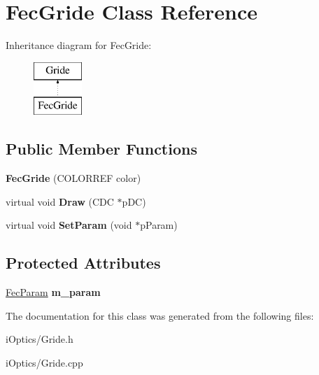 \hypertarget{class_fec_gride}{}\section{Fec\+Gride Class Reference}
\label{class_fec_gride}
Inheritance diagram for Fec\+Gride\+:\begin{figure}[H]
\begin{center}
\leavevmode
\includegraphics[height=2.000000cm]{class_fec_gride}
\end{center}
\end{figure}
\subsection*{Public Member Functions}
\begin{DoxyCompactItemize}
\item 
\mbox{\label{class_fec_gride_ae079599de4464cc0323d2f576a5a3208}} 
{\bfseries Fec\+Gride} (C\+O\+L\+O\+R\+R\+EF color)
\item 
\mbox{\label{class_fec_gride_a8b2a5b5290dfd68fce0ca3ed892e2609}} 
virtual void {\bfseries Draw} (C\+DC $\ast$p\+DC)
\item 
\mbox{\label{class_fec_gride_aec4499968594ccaf0531746926b562da}} 
virtual void {\bfseries Set\+Param} (void $\ast$p\+Param)
\end{DoxyCompactItemize}
\subsection*{Protected Attributes}
\begin{DoxyCompactItemize}
\item 
\mbox{\label{class_fec_gride_ad3ea90bbaa1bd84b5ed69b2c10232aad}} 
\mbox{\hyperlink{struct___fec_param}{Fec\+Param}} {\bfseries m\+\_\+param}
\end{DoxyCompactItemize}


The documentation for this class was generated from the following files\+:\begin{DoxyCompactItemize}
\item 
i\+Optics/Gride.\+h\item 
i\+Optics/Gride.\+cpp\end{DoxyCompactItemize}

